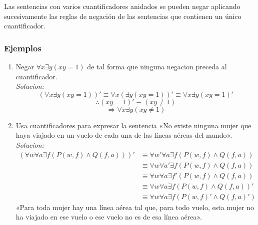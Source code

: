 \documentclass[]{article}
\begin{document}
Las sentencias con varios cuantificadores anidados se pueden negar aplicando sucesivamente las reglas de negación de las sentencias que contienen un único cuantificador.

\subsubsection*{Ejemplos}

\begin{enumerate}
	\item Negar $\forall{x}\exists{y} (xy = 1)$ de tal forma que ninguna negacion preceda al cuantificador.\\
	\textit{Solucion:}
	\begin{equation*}
		(\forall{x}\exists{y} (xy = 1))' \equiv \forall{x}(\exists{y} (xy = 1))' \equiv \forall{x}\exists{y} (xy = 1)'
	\end{equation*}
	\begin{equation*}
		\therefore (xy = 1)' \equiv (xy\neq1)
	\end{equation*}
	\begin{equation*}
		\Rightarrow \forall{x}\exists{y} (xy\neq1)
	\end{equation*}
	
	\item Usa cuantificadores para expresar la sentencia «No existe ninguna mujer que haya viajado en un vuelo de cada una de las líneas aéreas del mundo».\\
	\textit{Solucion:}
	\begin{equation}
		\begin{aligned}
			(\forall{w}\forall{a}\exists{f} (P(w, f) \wedge Q(f, a)))' &\equiv \forall{w}'\forall{a}\exists{f} (P(w, f) \wedge Q(f, a))\\
			&\equiv \forall{w}\forall{a}'\exists{f} (P(w, f) \wedge Q(f, a))\\
			&\equiv \forall{w}\forall{a}\exists{f}' (P(w, f) \wedge Q(f, a))\\
			&\equiv \forall{w}\forall{a}\exists{f} (P(w, f) \wedge Q(f, a))'\\
			&\equiv \forall{w}\forall{a}\exists{f} (P(w, f)' \wedge Q(f, a)')
		\end{aligned}
	\end{equation}
	«Para toda mujer hay una línea aérea tal que, para todo vuelo,
	esta mujer no ha viajado en ese vuelo o ese vuelo no es de esa línea aérea».


\end{enumerate}
\end{document}
